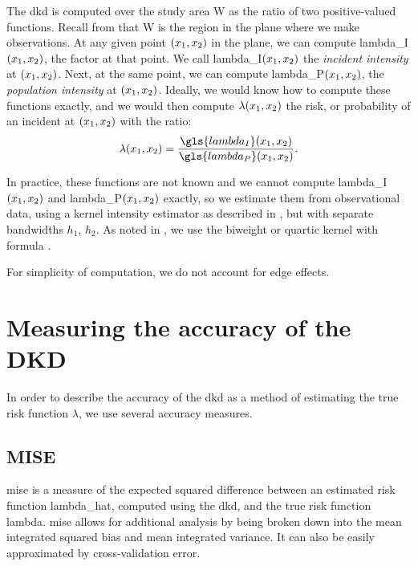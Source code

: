 The \gls{dkd} is computed over the study area \gls{W} as the ratio of two positive-valued functions.
Recall from  that \gls{W} is the region in the plane where we make observations.
At any given point $(x_1, x_2)$ in the plane, we can compute \gls{lambda_I}$(x_1, x_2)$, the \gls{factor} at that point.
We call \gls{lambda_I}$(x_1, x_2)$ the \textit{incident intensity} at $(x_1, x_2)$.
Next, at the same point, we can compute \gls{lambda_P}$(x_1, x_2)$, the \textit{population intensity} at $(x_1, x_2)$.
Ideally, we would know how to compute these functions exactly, and we would then compute $\lambda(x_1, x_2)$ the risk,
or probability of an incident at $(x_1, x_2)$ with the ratio:
\begin{equation}
    \lambda\xvec = \frac{\gls{lambda_I}\xvec}{\gls{lambda_P}\xvec}.
\end{equation}

In practice, these functions are not known and we cannot compute \gls{lambda_I}$(x_1, x_2)$ and \gls{lambda_P}$(x_1, x_2)$ exactly, 
so we estimate them from observational data,
using a \gls{kernel intensity estimator} as described in ,
but with separate bandwidths $h_1$, $h_2$.
As noted in ,
we use the biweight or quartic kernel with formula .

For simplicity of computation, we do not account for edge effects.


\section{Measuring the accuracy of the DKD}
\label{sec:method:accuracy}

In order to describe the accuracy of the \gls{dkd} as a method of estimating the true risk function $\lambda$,
we use several accuracy measures.

\subsection{MISE}
\label{subsec:method:mise}

\Gls{mise} is a measure of the expected squared difference between an estimated risk function \gls{lambda_hat},
computed using the \gls{dkd}, and the true risk function \gls{lambda}.
\Gls{mise} allows for additional analysis by being broken down into the mean integrated squared bias and mean integrated variance.
It can also be easily approximated by cross-validation error.

